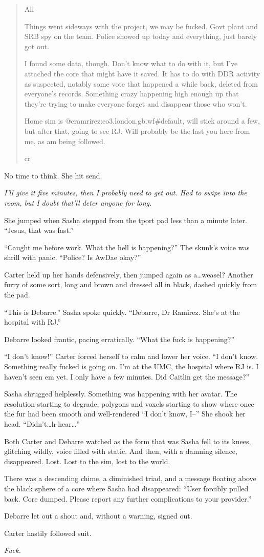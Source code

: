 \begin{quote}
All

Things went sideways with the project, we may be fucked. Govt plant and SRB spy on the team. Police showed up today and everything, just barely got out.

I found some data, though. Don't know what to do with it, but I've attached the core that might have it saved. It has to do with DDR activity as suspected, notably some vote that happened a while back, deleted from everyone's records. Something crazy happening high enough up that they're trying to make everyone forget and disappear those who won't.

Home sim is @cramrirez:eo3.london.gb.wf\#default, will stick around a few, but after that, going to see RJ. Will probably be the last you here from me, as am being followed.

cr
\end{quote}

No time to think. She hit send.

\emph{I'll give it five minutes, then I probably need to get out. Had to swipe into the room, but I doubt that'll deter anyone for long.}

She jumped when Sasha stepped from the tport pad less than a minute later. ``Jesus, that was fast.''

``Caught me before work. What the hell is happening?'' The skunk's voice was shrill with panic. ``Police? Is AwDae okay?''

Carter held up her hands defensively, then jumped again as a\ldots{}weasel? Another furry of some sort, long and brown and dressed all in black, dashed quickly from the pad.

``This is Debarre.'' Sasha spoke quickly. ``Debarre, Dr Ramirez. She's at the hospital with RJ.''

Debarre looked frantic, pacing erratically. ``What the fuck is happening?''

``I don't know!'' Carter forced herself to calm and lower her voice. ``I don't know. Something really fucked is going on. I'm at the UMC, the hospital where RJ is. I haven't seen em yet. I only have a few minutes. Did Caitlin get the message?''

Sasha shrugged helplessly. Something was happening with her avatar. The resolution starting to degrade, polygons and voxels starting to show where once the fur had been smooth and well-rendered ``I don't know, I--'' She shook her head. ``Didn't\ldots{}h-hear\ldots{}''

Both Carter and Debarre watched as the form that was Sasha fell to its knees, glitching wildly, voice filled with static. And then, with a damning silence, disappeared. Lost. Lost to the sim, lost to the world.

There was a descending chime, a diminished triad, and a message floating above the black sphere of a core where Sasha had disappeared: ``User forcibly pulled back. Core dumped. Please report any further complications to your provider.''

Debarre let out a shout and, without a warning, signed out.

Carter hastily followed suit.

\emph{Fuck.}
